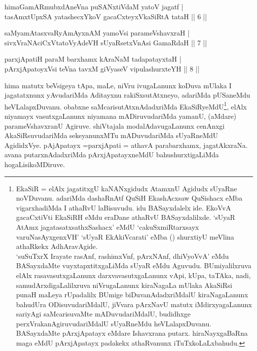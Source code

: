\begin{shl}
himaGamARmubxdAneVna puSANxtiVdaM yatoV jagatf | \\
tasAmxtUpxSA yatashecxYkoV gacaCxteyxVkaSiRtA tataH \hfill||  6 || 
\end{shl}

\begin{shl}
saMyamAtasxvaRyAmAyxnAM yamoV\s si parameVshavxraH | \\
sivxVraNAciCxVtatoVyAdeVH sUyaRsetxVnAsi GamaRdaH \hfill||  7 ||
\end{shl}

\begin{shl}
parxjApatiH paraM barxhamx kAraNaM tadapatayxtaH | \\
pArxjApatoyxV\s si teVna tavxM giVyaseV vipulashurxteYH \hfill||  8 || 
\end{shl}

\begin{artha} 
hima matutx beVsigeya tApa, maLe, niVru ivugaLanunx koDuva mUlaka I 
jagatatxnunx yAvudariMda Aditayxnu rakiSxsutAtxneyo, adariMda 
pUSaneMdu heVLalapxDuvanu. obabxne saMcarisutAtxnAdadxriMda 
EkaSiRyeMdU\footnote{EkaSiR = elAlx jagatitxgU kaNANxgidudx AtamxnU 
Agidudx sUyaRne noVDuvanu. adariMda dashaRnAtf QuSiH EkashAcxsaw 
QuSishacx eMba vigarxhadiMda I athaRvU laBisuvudu. idu BASayxdalelx 
ide. EkoVvA gacaCxtiVti EkaSiRH eMdu eraDane athaRvU BASayxdalilxde. 
`sUyaR AtAmx jagata\break satxsathxSashacx' eMdU `cakuSxmiRtarxsayx 
varuNasAyxgenxVH' `sUyaR EkAkiVcarati' eMba () shurxtiyU meVlina 
athaRkekx AdhAravAgide.\\ 
`suSuTxrX Irayate rasAnf, rashimxVnf, pArxNAnf, dhiVyoVvA' eMdu BASayxdaMte vuyxtapxtitxgaLiMda sUyaR eMdu Aguvudu. 
BUmiyalilxruva elAlx rasavasutxgaLanunx darxvavasutxgaLanunx vApi, 
kUpa, taTAka, nadi, samudArxdigaLalilxruva niVrugaLanunx kiraNagaLa 
mUlaka AkaSiRsi punaH maLeya rUpadalilx BUmige biDuvanAdadxriMdalU 
kiraNagaLanunx bahudUra ODisuvudariMdalU, jiVvara pArxNavU matutx 
iMdirxyagaLanunx sariyAgi saMcarisuvaMte mADuvudariMdalU, budidhxge 
perxVrakanAgiruvudariMdalU sUyaRneMdu heVLalapxDuvanu. BASayxdaMte 
pArxjApatayx eMdare Ishavxrana putarx. hiraNayxgaBaRna maga eMdU 
pArxjApatayx padakekx athaRvanunx iTuTxkoLaLxbahudu.}, 
elAlx niyamayx vasutxgaLanunx niyamana 
mADiruvudariMda yamanU, (aMdare) parameVshavxranU Agiruve. shiVtajala 
modalAdavugaLanunx cenAnxgi AkaSiRsuvudariMda sekeyanunxMTu 
mADuvudariMda sUyaRneMdU AgididxVye. pAjApatayx =\break parxjApati = athavA 
parabarxhamx, jagatAkxraNa. avana putarxnAdadxriMda pArxjApatayxneMdU 
bahushurxtigaLiMda hogaLisikoMDiruve.
\end{artha}

